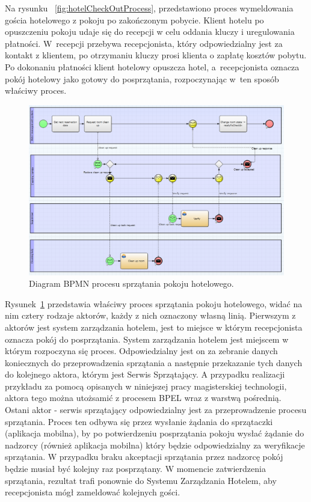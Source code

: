 Na rysunku ~\ref{fig:hotelCheckOutProcess}, przedstawiono proces wymeldowania gościa hotelowego z pokoju po zakończonym pobycie. Klient hotelu po opuszczeniu pokoju udaje się do recepcji w celu oddania kluczy i uregulowania płatności. W~recepcji przebywa recepcjonista, który odpowiedzialny jest za kontakt z klientem, po otrzymaniu kluczy prosi klienta o zapłatę kosztów pobytu. Po dokonaniu płatności klient hotelowy opuszcza hotel, a~recepcjonista oznacza pokój hotelowy jako gotowy do posprzątania, rozpoczynając w~ten sposób właściwy proces. 

\begin{figure}[h]
\centerline{\includegraphics[scale=0.45]{roomCleanUpProcess}}
\caption{Diagram BPMN procesu sprzątania pokoju hotelowego.}
\label{fig:roomCleanUpProcess}
\end{figure}

Rysunek~\ref{fig:roomCleanUpProcess} przedstawia właściwy proces sprzątania pokoju hotelowego, widać na nim cztery rodzaje aktorów, każdy z nich oznaczony własną linią. Pierwszym z aktorów jest system zarządzania hotelem, jest to miejsce w którym recepcjonista oznacza pokój do posprzątania. System zarządzania hotelem jest miejscem w którym rozpoczyna się proces. Odpowiedzialny jest on za zebranie danych koniecznych do przeprowadzenia sprzątania a następnie przekazanie tych danych do kolejnego aktora, którym jest Serwis Sprzątający. A przypadku realizacji przykładu za pomocą opisanych w niniejszej pracy magisterskiej technologii, aktora tego można utożsamić z procesem BPEL wraz z warstwą pośrednią. Ostani aktor - serwis sprzątający odpowiedzialny jest za przeprowadzenie procesu sprzątania. Proces ten odbywa się przez wysłanie żądania do sprzątaczki (aplikacja mobilna), by po potwierdzeniu posprzątania pokoju wysłać żądanie do nadzorcy (również aplikacja mobilna) który będzie odpowiedzialny za weryfikacje sprzątania.  W przypadku braku akceptacji sprzątania przez nadzorcę pokój będzie musiał być kolejny raz posprzątany. W momencie zatwierdzenia sprzątania, rezultat trafi ponownie do Systemu Zarządzania Hotelem, aby recepcjonista mógł zameldować kolejnych gości. 

